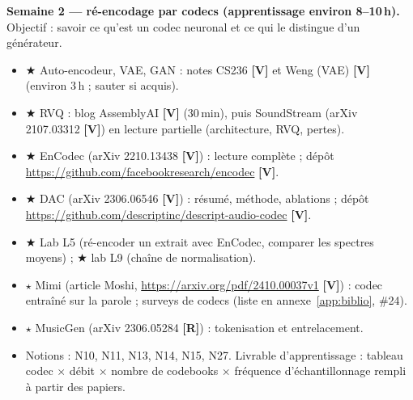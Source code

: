 \documentclass[11pt,a4paper]{article}
\newcommand{\sV}{\textbf{[V]}}
\newcommand{\sR}{\textbf{[R]}}
\newcommand{\smin}{$\bigstar$}   %
\newcommand{\sapp}{$\star$}      %
\begin{document}
\textbf{Semaine 2 --- ré-encodage par codecs (apprentissage environ 8--10\,h).} Objectif : savoir ce qu'est un codec neuronal et ce qui le distingue d'un générateur.
\begin{itemize}
  \item \smin{} Auto-encodeur, VAE, GAN : notes CS236 \sV{} et Weng (VAE) \sV{} (environ 3\,h ; sauter si acquis).
  \item \smin{} RVQ : blog AssemblyAI \sV{} (30\,min), puis SoundStream (arXiv 2107.03312 \sV) en lecture partielle (architecture, RVQ, pertes).
  \item \smin{} EnCodec (arXiv 2210.13438 \sV) : lecture complète ; dépôt \url{https://github.com/facebookresearch/encodec} \sV.
  \item \smin{} DAC (arXiv 2306.06546 \sV) : résumé, méthode, ablations ; dépôt \url{https://github.com/descriptinc/descript-audio-codec} \sV.
  \item \smin{} Lab L5 (ré-encoder un extrait avec EnCodec, comparer les spectres moyens) ; \smin{} lab L9 (chaîne de normalisation).
  \item \sapp{} Mimi (article Moshi, \url{https://arxiv.org/pdf/2410.00037v1} \sV) : codec entraîné sur la parole ; surveys de codecs (liste en annexe~\ref{app:biblio}, \#24).
  \item \sapp{} MusicGen (arXiv 2306.05284 \sR) : tokenisation et entrelacement.
  \item Notions : N10, N11, N13, N14, N15, N27. Livrable d'apprentissage : tableau \og codec $\times$ débit $\times$ nombre de codebooks $\times$ fréquence d'échantillonnage \fg{} rempli à partir des papiers.
\end{itemize}
\end{document}
